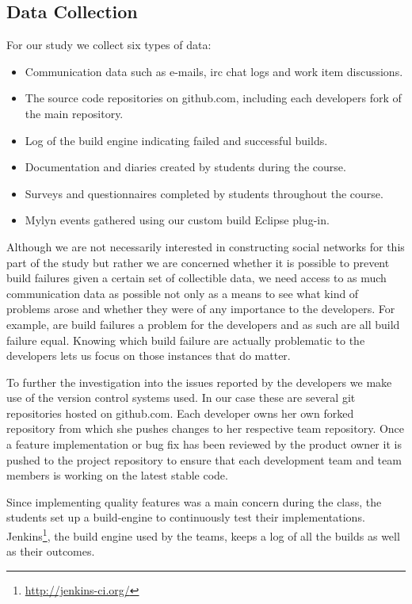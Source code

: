 \subsection{Data Collection}
For our study we collect six types of data:
\begin{itemize}
\item Communication data such as e-mails, irc chat logs and work item discussions.
\item The source code repositories on github.com, including each developers fork of the main repository.
\item Log of the build engine indicating failed and successful builds.
\item Documentation and diaries created by students during the course.
\item Surveys and questionnaires completed by students throughout the course. 
\item Mylyn events gathered using our custom build Eclipse plug-in.
\end{itemize}

Although we are not necessarily interested in constructing social networks for this part of the study but rather we are concerned whether it is possible to prevent build failures given a certain set of collectible data, we need access to as much communication data as possible not only as a means to see what kind of problems arose and whether they were of any importance to the developers.
For example, are build failures a problem for the developers and as such are all build failure equal.
Knowing which build failure are actually problematic to the developers lets us focus on those instances that do matter.

To further the investigation into the issues reported by the developers we make use of the version control systems used.
In our case these are several git repositories hosted on github.com.
Each developer owns her own forked repository from which she pushes changes to her respective team repository.
Once a feature implementation or bug fix has been reviewed by the product owner it is pushed to the project repository to ensure that each development team and team members is working on the latest stable code.

Since implementing quality features was a main concern during the class, the students set up a build-engine to continuously test their implementations.
Jenkins\footnote{\url{http://jenkins-ci.org/}}, the build engine used by the teams, keeps a log of all the builds as well as their outcomes.

